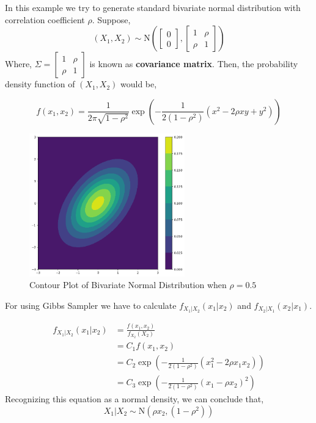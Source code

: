 \begin{example}

    In this example we try to generate standard bivariate normal distribution with correlation coefficient $ \rho $. Suppose,
    \[
        (X_1, X_2) \sim \text{N}\left(  
            \begin{bmatrix}
                0\\
                0
            \end{bmatrix},
            \begin{bmatrix}
                1 & \rho \\ 
                \rho & 1
            \end{bmatrix}
        \right)
    \]
    Where, $ \Sigma = \begin{bmatrix}
        1 & \rho \\ 
        \rho & 1
    \end{bmatrix} $ is known as \textbf{covariance matrix}.  Then, the probability density function of $ (X_1,X_2) $ would be,

    \[
        f(x_1,x_2) = \frac{1}{2 \pi \sqrt{1-\rho^2}} \exp \left( - \frac{1}{2(1-\rho^2)} (x^2 -2 \rho xy + y^2  ) \right)
    \]
    
    \begin{figure}[H]
        \centering
        \includegraphics[width=0.6\textwidth]{images/gibbs/example1/con-plot.png}
        \caption{Contour Plot of Bivariate Normal Distribution when $ \rho = 0.5 $}
    \end{figure}

    For using Gibbs Sampler we have to calculate $ f_{X_1|X_2}(x_1|x_2) $ and $ f_{X_2|X_1}(x_2|x_1) $.

    \begin{align*}
        f_{X_1|X_2}(x_1|x_2) &= \frac{f(x_1,x_2)}{f_{X_2}(X_2)} \\ 
                    &=C_1 f(x_1,x_2) \\
                    &=C_2 \exp \left( - \frac{1}{2 (1-\rho^2)} (x_1^2 - 2 \rho x_1x_2) \right) \\
                    &= C_3 \exp \left(- \frac{1}{2 (1-\rho^2)} (x_1 - \rho x_2)^2   \right)
    \end{align*}
     Recognizing this equation as a normal density, we can conclude that, 
     \[ X_1|X_2 \sim \text{N}(\rho x_2, (1-\rho^2)) \]


\end{example}

